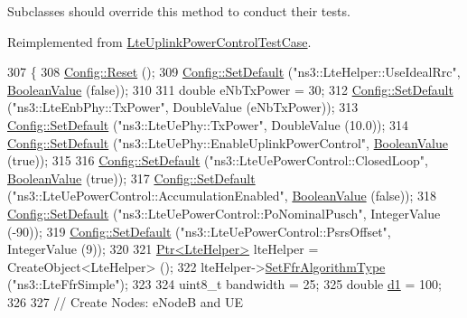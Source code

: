 Subclasses should override this method to conduct their tests. 

Reimplemented from \hyperlink{classLteUplinkPowerControlTestCase_ade34c47524d78d2154c15ba6c257a581}{Lte\+Uplink\+Power\+Control\+Test\+Case}.


\begin{DoxyCode}
307 \{
308   \hyperlink{group__config_ga2c1b65724f42f8c72276d7e7ad6df6db}{Config::Reset} ();
309   \hyperlink{group__config_ga2e7882df849d8ba4aaad31c934c40c06}{Config::SetDefault} (\textcolor{stringliteral}{"ns3::LteHelper::UseIdealRrc"}, 
      \hyperlink{classns3_1_1BooleanValue}{BooleanValue} (\textcolor{keyword}{false}));
310 
311   \textcolor{keywordtype}{double} eNbTxPower = 30;
312   \hyperlink{group__config_ga2e7882df849d8ba4aaad31c934c40c06}{Config::SetDefault} (\textcolor{stringliteral}{"ns3::LteEnbPhy::TxPower"}, DoubleValue (eNbTxPower));
313   \hyperlink{group__config_ga2e7882df849d8ba4aaad31c934c40c06}{Config::SetDefault} (\textcolor{stringliteral}{"ns3::LteUePhy::TxPower"}, DoubleValue (10.0));
314   \hyperlink{group__config_ga2e7882df849d8ba4aaad31c934c40c06}{Config::SetDefault} (\textcolor{stringliteral}{"ns3::LteUePhy::EnableUplinkPowerControl"}, 
      \hyperlink{classns3_1_1BooleanValue}{BooleanValue} (\textcolor{keyword}{true}));
315 
316   \hyperlink{group__config_ga2e7882df849d8ba4aaad31c934c40c06}{Config::SetDefault} (\textcolor{stringliteral}{"ns3::LteUePowerControl::ClosedLoop"}, 
      \hyperlink{classns3_1_1BooleanValue}{BooleanValue} (\textcolor{keyword}{true}));
317   \hyperlink{group__config_ga2e7882df849d8ba4aaad31c934c40c06}{Config::SetDefault} (\textcolor{stringliteral}{"ns3::LteUePowerControl::AccumulationEnabled"}, 
      \hyperlink{classns3_1_1BooleanValue}{BooleanValue} (\textcolor{keyword}{false}));
318   \hyperlink{group__config_ga2e7882df849d8ba4aaad31c934c40c06}{Config::SetDefault} (\textcolor{stringliteral}{"ns3::LteUePowerControl::PoNominalPusch"}, IntegerValue (-90));
319   \hyperlink{group__config_ga2e7882df849d8ba4aaad31c934c40c06}{Config::SetDefault} (\textcolor{stringliteral}{"ns3::LteUePowerControl::PsrsOffset"}, IntegerValue (9));
320 
321   \hyperlink{classns3_1_1Ptr}{Ptr<LteHelper>} lteHelper = CreateObject<LteHelper> ();
322   lteHelper->\hyperlink{classns3_1_1LteHelper_a035c6b03305c1511975362f80425b5fc}{SetFfrAlgorithmType} (\textcolor{stringliteral}{"ns3::LteFfrSimple"});
323 
324   uint8\_t bandwidth = 25;
325   \textcolor{keywordtype}{double} \hyperlink{lte__link__budget__interference_8m_ab5ca0c44c6f0a063a5219b3749db661f}{d1} = 100;
326 
327   \textcolor{comment}{// Create Nodes: eNodeB and UE}

\end{DoxyCode}
